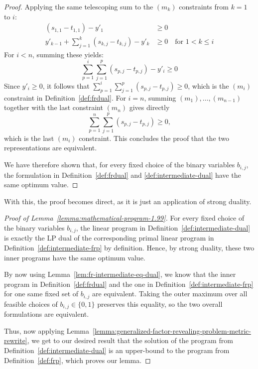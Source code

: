 \begin{proof}
    Applying the same telescoping sum to the $(m_k)$ constraints from $k=1$ to $i$:
    \begin{align*}
        (s_{1,1} - t_{1,1}) - y'_1 &\ge 0 \\
        y'_{k-1} + \sum_{j=1}^k (s_{k,j} - t_{k,j}) - y'_k &\ge 0 \quad \text{for } 1 < k \le i
    \end{align*}
    For $i<n$, summing these yields:
    \begin{equation*}
        \sum_{p=1}^i \sum_{j=1}^p (s_{p,j} - t_{p,j}) - y'_i \geq 0
    \end{equation*}
    Since $y'_i \geq 0$, it follows that $\sum_{p=1}^i \sum_{j=1}^p (s_{p,j} - t_{p,j}) \geq 0$, which is the $(m_i)$ constraint in Definition~\ref{def:frdual}. For $i=n$, summing $(m_1),\ldots,(m_{n-1})$ together with the last constraint $(m_n)$ gives directly
    \begin{equation*}
        \sum_{p=1}^n \sum_{j=1}^p (s_{p,j} - t_{p,j}) \geq 0,
    \end{equation*}
    which is the last $(m_i)$ constraint. This concludes the proof that the two representations are equivalent.

    
    We have therefore shown that, for every fixed choice of the binary variables $b_{i,j}$, the formulation in Definition~\ref{def:frdual} and \ref{def:intermediate-dual} have the same optimum value. 
\end{proof}

With this, the proof becomes direct, as it is just an application of strong duality.

\begin{proof}[Proof of Lemma~\ref{lemma:mathematical-program-1.99}]
    For every fixed choice of the binary variables $b_{i,j}$, the linear program in Definition~\ref{def:intermediate-dual} is exactly the LP dual of the corresponding primal linear program in Definition~\ref{def:intermediate-frp} by definition. Hence, by strong duality, these two inner programs have the same optimum value. 
    
    By now using Lemma~\ref{lem:fr-intermediate-eq-dual}, we know that the inner program in Definition~\ref{def:frdual} and the one in Definition~\ref{def:intermediate-frp} for one same fixed set of $b_{i,j}$ are equivalent.
    Taking the outer maximum over all feasible choices of $b_{i,j}\in\{0,1\}$ preserves this equality, so the two overall formulations are equivalent.

    Thus, now applying Lemma~\ref{lemma:generalized-factor-revealing-problem-metric-rewrite}, we get to our desired result that the solution of the program from Definition~\ref{def:intermediate-dual} is an upper-bound to the program from Definition~\ref{def:frp}, which proves our lemma.
\end{proof}

